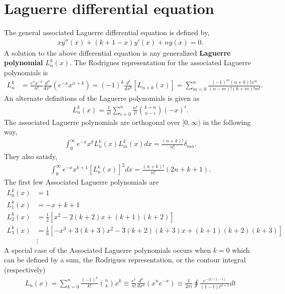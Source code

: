 \section{Laguerre differential equation}
The general associated Laguerre differential equation is defined by,
\begin{align}
	xy''(x)+(k+1-x)y'(x)+n y(x)=0.
\end{align}
A solution to the above differential equation is any generalized \textbf{Laguerre polynomial} $L_n^k(x)$. The Rodrigues representation for the associated Laguerre polynomials is
\begin{align}
	L_n^k &= \frac{e^{x}x^{-k}}{n!}\frac{d^n}{dx^n}(e^{-x}x^{n+k}) 
	=(-1)^k\frac{d^k}{dx^k}[L_{n+k}(x)] = \sum_{m=0}^{n}\frac{(-1)^m(n+k)!x^m}{(n-m)!(k+m)!m!}.
\end{align} 
An alternate definitions of the Laguerre polynomials is given as
\begin{align}
	L_n^k(x)=\frac{1}{n!}\sum_{i=0}^{n}\frac{n!}{i!}{{k+n}\choose{n-i}}(-x)^i.
\end{align}
The associated Laguerre polynomials are orthogonal over $[0,\infty)$ in the following way,
\begin{align}
	\int_{0}^{\infty}e^{-x}x^kL_n^k(x)L_m^k(x)dx=\frac{(n+k)!}{n!}\delta_{mn}.
\end{align}
They also satisfy,
\begin{align}
	\int_{0}^{\infty}e^{-x}x^{k+1}[L_n^k(x)]^2dx=\frac{(n+k)!}{n!}(2n+k+1).
\end{align}
The first few Associated Laguerre polynomials are
\begin{align}
	L_0^k(x) &= 1 \\
	L_1^k(x) &= -x+k+1 \\
	L_2^k(x) &= \frac{1}{2}\left[x^2-2(k+2)x+(k+1)(k+2)\right]	\\
	L_3^k(x) &= \frac{1}{6}\left[-x^3+3(k+3)x^2-3(k+2)(k+3)x+(k+1)(k+2)(k+3)\right] \\
	&\vdots
\end{align}
A special case of the Associated Laguerre polynomials occurs when $k=0$ which can be defined by a sum, the Rodrigues representation, or the contour integral (respectively)
\begin{align}
	L_n(x) = \sum_{k=0}^{n}\frac{(-1)^k}{k!}{{n}\choose{k}}x^k \equiv \frac{e^x}{n!}\frac{d^n}{dx^n}(x^ne^{-x}) \equiv \frac{1}{2\pi i}\oint \frac{e^{-zt/(1-t)}}{(1-t)t^{n+1}}dt
\end{align}






